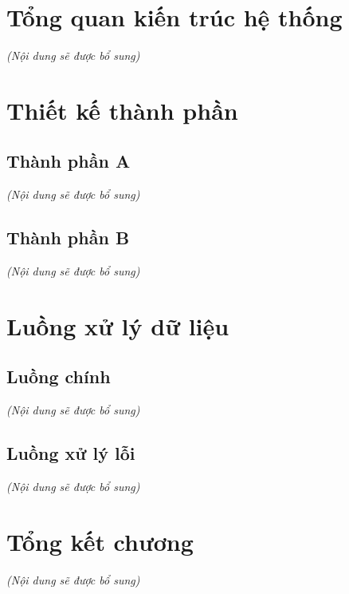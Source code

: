 \section{Tổng quan kiến trúc hệ thống}
\textit{(Nội dung sẽ được bổ sung)}

\section{Thiết kế thành phần}
\subsection{Thành phần A}
\textit{(Nội dung sẽ được bổ sung)}

\subsection{Thành phần B}
\textit{(Nội dung sẽ được bổ sung)}

\section{Luồng xử lý dữ liệu}
\subsection{Luồng chính}
\textit{(Nội dung sẽ được bổ sung)}

\subsection{Luồng xử lý lỗi}
\textit{(Nội dung sẽ được bổ sung)}

\section{Tổng kết chương}
\textit{(Nội dung sẽ được bổ sung)}
